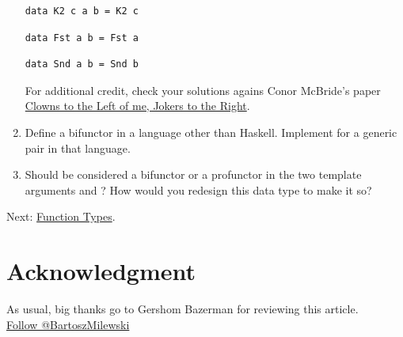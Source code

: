 \begin{enumerate}
\begin{verbatim}
data K2 c a b = K2 c
\end{verbatim}

\begin{verbatim}
data Fst a b = Fst a
\end{verbatim}

\begin{verbatim}
data Snd a b = Snd b
\end{verbatim}

  For additional credit, check your solutions agains Conor McBride's
  paper \href{http://strictlypositive.org/CJ.pdf}{Clowns to the Left of
  me, Jokers to the Right}.
\item
  Define a bifunctor in a language other than Haskell. Implement
   for a generic pair in that language.
\item
  Should  be considered a bifunctor or a profunctor in
  the two template arguments  and ? How would you
  redesign this data type to make it so?
\end{enumerate}

Next:
\href{https://bartoszmilewski.com/2015/03/13/function-types/}{Function
Types}.

\section{Acknowledgment}\label{acknowledgment}

As usual, big thanks go to Gershom Bazerman for reviewing this
article.\\
\href{https://twitter.com/BartoszMilewski}{Follow @BartoszMilewski}
